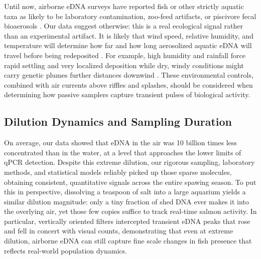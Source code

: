 \documentclass{article}
\begin{document}
Until now, airborne eDNA surveys have reported fish or other strictly aquatic taxa as likely to be laboratory contamination, zoo-feed artifacts, or piscivore fecal bioaerosols \cite{klepke2022,lynggaard2023, sullivan2023,lynggaard2022}. Our data suggest otherwise: this is a real ecological signal rather than an experimental artifact. It is likely that wind speed, relative humidity, and temperature will determine how far and how long aerosolized aquatic eDNA will travel before being redeposited \cite{abrego2024,giolai2024}. For example, high humidity and rainfall force rapid settling and very localized deposition while dry, windy conditions might carry genetic plumes further distances downwind \cite{galban2021,maki2023}. These environmental controls, combined with air currents above riffles and splashes, should be considered when determining how passive samplers capture transient pulses of biological activity.

\subsection{Dilution Dynamics and Sampling Duration}
On average, our data showed that eDNA in the air was 10 billion times less concentrated than in the water, at a level that approaches the lower limits of qPCR detection. Despite this extreme dilution, our rigorous sampling, laboratory methods, and statistical models reliably picked up those sparse molecules, obtaining consistent, quantitative signals across the entire spawing season. To put this in perspective, dissolving a teaspoon of salt into a large aquarium yields a similar dilution magnitude: only a tiny fraction of shed DNA ever makes it into the overlying air, yet those few copies suffice to track real-time salmon activity. In particular, vertically oriented filters intercepted transient eDNA peaks that rose and fell in concert with visual counts, demonstrating that even at extreme dilution, airborne eDNA can still capture fine scale changes in fish presence that reflects real-world population dynamics.
\end{document}
